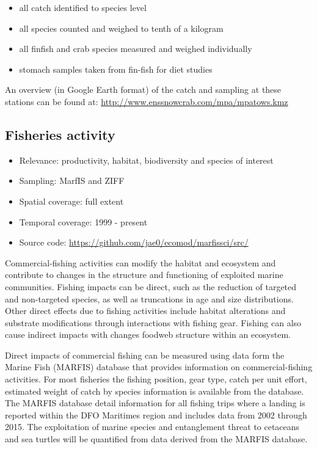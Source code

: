 \documentclass[letterpaper,portrait,11pt]{scrartcl}
\numberwithin{equation}{section}		%
\numberwithin{figure}{section}		%
\numberwithin{table}{section}				%
\begin{document}
\begin{itemize}
  \item all catch identified to species level
  \item all species counted and weighed to tenth of a kilogram
  \item all finfish and crab species measured and weighed individually
  \item stomach samples taken from fin-fish for diet studies
\end{itemize}

An overview (in Google Earth format) of the catch and sampling at these stations can be found at: \url{http://www.enssnowcrab.com/mpa/mpatows.kmz}


\subsection{Fisheries activity}


\begin{itemize}
	\item Relevance:  productivity, habitat, biodiversity and species of interest
	\item Sampling:  MarfIS and ZIFF
	\item Spatial coverage: full extent 
	\item Temporal coverage: 1999 - present
	\item Source code: \url{https://github.com/jae0/ecomod/marfissci/src/}
\end{itemize}	



Commercial-fishing activities can modify the habitat and ecosystem and contribute to changes in the structure and functioning of exploited marine communities.  Fishing impacts can be direct, such as the reduction of targeted and non-targeted species, as well as truncations in age and size distributions.  Other direct effects due to fishing activities include habitat alterations and substrate modifications through interactions with fishing gear. Fishing can also cause indirect impacts with changes foodweb structure within an ecosystem.  

Direct impacts of commercial fishing can be measured using data form the Marine Fish (MARFIS) database that provides information on commercial-fishing activities.  For most fisheries the fishing position, gear type, catch per unit effort, estimated weight of catch by species information is available from the database. The MARFIS database detail information for all fishing trips where a landing is reported within the DFO Maritimes region and includes data from 2002 through 2015. The exploitation of marine species and entanglement threat to cetaceans and sea turtles will be quantified from data derived from the MARFIS database.
   
\end{document}
